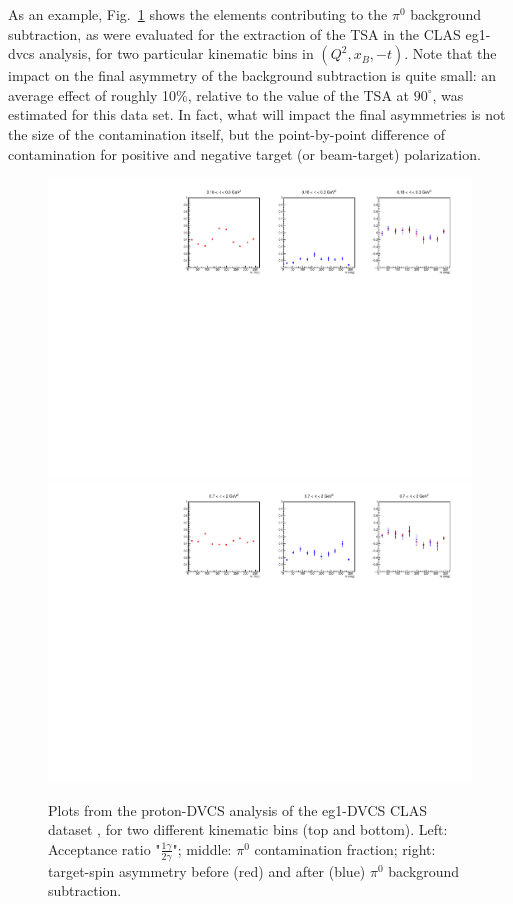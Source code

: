 As an example, Fig.~\ref{pi0_eg1dvcs} shows the elements contributing to the $\pi^0$ background subtraction, as were evaluated for the extraction of the TSA in the CLAS eg1-dvcs analysis, for two particular kinematic bins in $(Q^2, x_B, -t)$. Note that the impact on the final asymmetry of the background subtraction is quite small: an average effect of roughly 10\%, relative to the value of the TSA at $90^{\circ}$, was estimated for this data set. In fact, what will impact the final asymmetries is not the size of the contamination itself, but the point-by-point difference of contamination for positive and negative target (or beam-target) polarization. 

\begin{figure}  
\begin{center}
\includegraphics[width=140mm]{pi0_cont_tsa.pdf}
\includegraphics[width=140mm]{bin_q20_xb3_t3.pdf}
\caption [pDVCS results from the eg1-DVCS CLAS dataset]
{Plots from the proton-DVCS analysis of the eg1-DVCS CLAS dataset \cite{pisano}, for two different kinematic bins (top and bottom). Left: Acceptance ratio "$\frac{1 \gamma}{2 \gamma}$"; middle: $\pi^0$ contamination fraction; right: target-spin asymmetry before (red) and after (blue) $\pi^0$ background subtraction.}
\label{pi0_eg1dvcs}
\end{center}
\end{figure}

